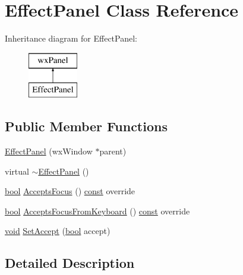 \hypertarget{class_effect_panel}{}\section{Effect\+Panel Class Reference}
\label{class_effect_panel}
Inheritance diagram for Effect\+Panel\+:\begin{figure}[H]
\begin{center}
\leavevmode
\includegraphics[height=2.000000cm]{class_effect_panel}
\end{center}
\end{figure}
\subsection*{Public Member Functions}
\begin{DoxyCompactItemize}
\item 
\hyperlink{class_effect_panel_aefed49145a30936a6ea68680de062012}{Effect\+Panel} (wx\+Window $\ast$parent)
\item 
virtual \hyperlink{class_effect_panel_a5ff7106eabfe35185375bc5a2b7956bf}{$\sim$\+Effect\+Panel} ()
\item 
\hyperlink{mac_2config_2i386_2lib-src_2libsoxr_2soxr-config_8h_abb452686968e48b67397da5f97445f5b}{bool} \hyperlink{class_effect_panel_ac2ffba492bde4912dc8b69ae628bcd79}{Accepts\+Focus} () \hyperlink{getopt1_8c_a2c212835823e3c54a8ab6d95c652660e}{const}  override
\item 
\hyperlink{mac_2config_2i386_2lib-src_2libsoxr_2soxr-config_8h_abb452686968e48b67397da5f97445f5b}{bool} \hyperlink{class_effect_panel_adede3754a81135b6d5f97070854a0cb7}{Accepts\+Focus\+From\+Keyboard} () \hyperlink{getopt1_8c_a2c212835823e3c54a8ab6d95c652660e}{const}  override
\item 
\hyperlink{sound_8c_ae35f5844602719cf66324f4de2a658b3}{void} \hyperlink{class_effect_panel_a9d0fdecbc65a9a8d080bced7efb99228}{Set\+Accept} (\hyperlink{mac_2config_2i386_2lib-src_2libsoxr_2soxr-config_8h_abb452686968e48b67397da5f97445f5b}{bool} accept)
\end{DoxyCompactItemize}


\subsection{Detailed Description}


